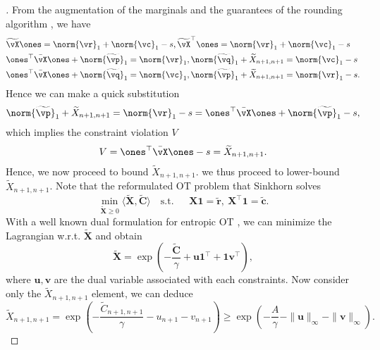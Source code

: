 \begin{proof}[\unskip \nopunct]
    From the augmentation of the marginals \citep{Chapel-nips2020} and the guarantees of the rounding algorithm \citep[Algorithm 2]{altschuler2017near}, we have 
    \begin{align*}
        &\widetilde{\vX} \ones = \norm{\vr}_1 + \norm{\vc}_1 - s,  \widetilde{\vX}^\top \ones = \norm{\vr}_1 + \norm{\vc}_1 - s\\
        &\ones^\top \Bar{\vX} \ones + \norm{\widetilde{\vp}}_1 = \norm{\vr}_1,  \norm{\widetilde{\vq}}_1 + \widetilde{X}_{n+1,n+1} = \norm{\vc}_1 - s\\
        &\ones^\top \Bar{\vX} \ones + \norm{\widetilde{\vq}}_1 = \norm{\vc}_1, \norm{\widetilde{\vp}}_1 + \widetilde{X}_{n+1,n+1} = \norm{\vr}_1 - s.
    \end{align*}
    Hence we can make a quick substitution 
    \begin{align*}
        \norm{\widetilde{\vp}}_1 + \widetilde{X}_{n+1,n+1} = \norm{\vr}_1 - s = \ones^\top \Bar{\vX} \ones + \norm{\widetilde{\vp}}_1 - s,
    \end{align*}
    which implies the constraint violation $V$
    \begin{align*}
        V = \ones^\top \Bar{\vX} \ones- s = \widetilde{X}_{n+1,n+1}.
    \end{align*}
    Hence, we now proceed to bound $\widetilde{X}_{n+1,n+1}$.
    we thus proceed to lower-bound $\tilde{X}_{n+1,n+1}$. Note that the reformulated OT problem that Sinkhorn solves 
    \begin{equation*}
        \min_{\mathbf{\tilde{X}} \geq 0} \langle \mathbf{\tilde{X}},\mathbf{\tilde{C}} \rangle \quad \text{s.t. } \quad \: \mathbf{X} \mathbf{1} = \mathbf{\tilde{r}}, \: \mathbf{X}^\top \mathbf{1} = \mathbf{\tilde{c}}.
    \end{equation*}
    With a well known dual formulation for entropic OT \citep{lin2019efficient}, we can minimize the Lagrangian w.r.t. $\mathbf{\tilde{X}}$ and obtain
    \begin{equation*}
        \mathbf{\tilde{X}} = \exp \left( - \dfrac{\mathbf{\tilde{C}}}{\gamma} + \mathbf{u} \mathbf{1}^\top + \mathbf{1} \mathbf{v}^\top\right), 
    \end{equation*}
where $\mathbf{u}, \mathbf{v}$ are the dual variable associated with each constraints. Now consider only the $\tilde{X}_{n+1,n+1}$ element, we can deduce
\begin{equation*}
   \tilde{X}_{n+1,n+1} = \exp \left(-\frac{\tilde{C}_{n+1,n+1}}{\gamma} - u_{n+1} -  v_{n+1}\right) \geq \exp \left( - \dfrac{A}{\gamma} - \|\mathbf{u}\|_\infty - \|\mathbf{v}\|_\infty\right).

\end{equation*}
\end{proof}
